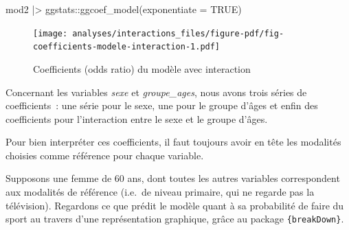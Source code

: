 \documentclass[
  letterpaper,
  DIV=11,
  numbers=noendperiod,
  oneside]{scrreprt}
\newenvironment{Shaded}{\begin{snugshade}}{\end{snugshade}}
\newcommand{\AttributeTok}[1]{\textcolor[rgb]{0.40,0.45,0.13}{#1}}
\newcommand{\ConstantTok}[1]{\textcolor[rgb]{0.56,0.35,0.01}{#1}}
\newcommand{\ControlFlowTok}[1]{\textcolor[rgb]{0.00,0.23,0.31}{#1}}
\newcommand{\DecValTok}[1]{\textcolor[rgb]{0.68,0.00,0.00}{#1}}
\newcommand{\FunctionTok}[1]{\textcolor[rgb]{0.28,0.35,0.67}{#1}}
\newcommand{\NormalTok}[1]{\textcolor[rgb]{0.00,0.23,0.31}{#1}}
\newcommand{\OtherTok}[1]{\textcolor[rgb]{0.00,0.23,0.31}{#1}}
\newcommand{\SpecialCharTok}[1]{\textcolor[rgb]{0.37,0.37,0.37}{#1}}
\newcommand{\StringTok}[1]{\textcolor[rgb]{0.13,0.47,0.30}{#1}}
\begin{document}
\begin{Shaded}
\begin{Highlighting}[]
\NormalTok{mod2 }\SpecialCharTok{|\textgreater{}} 
\NormalTok{  ggstats}\SpecialCharTok{::}\FunctionTok{ggcoef\_model}\NormalTok{(}\AttributeTok{exponentiate =} \ConstantTok{TRUE}\NormalTok{)}
\end{Highlighting}
\end{Shaded}

\begin{figure}[H]

{\centering \texttt{[image: analyses/interactions\_files/figure-pdf/fig-coefficients-modele-interaction-1.pdf]}

}

\caption{\label{fig-coefficients-modele-interaction}Coefficients (odds
ratio) du modèle avec interaction}

\end{figure}

Concernant les variables \emph{sexe} et \emph{groupe\_ages}, nous avons
trois séries de coefficients~: une série pour le sexe, une pour le
groupe d'âges et enfin des coefficients pour l'interaction entre le sexe
et le groupe d'âges.

Pour bien interpréter ces coefficients, il faut toujours avoir en tête
les modalités choisies comme référence pour chaque variable.

Supposons une femme de 60 ans, dont toutes les autres variables
correspondent aux modalités de référence (i.e.~de niveau primaire, qui
ne regarde pas la télévision). Regardons ce que prédit le modèle quant à
sa probabilité de faire du sport au travers d'une représentation
graphique, grâce au package \texttt{\{breakDown\}}.

\begin{Shaded}
\end{Shaded}
\end{document}
